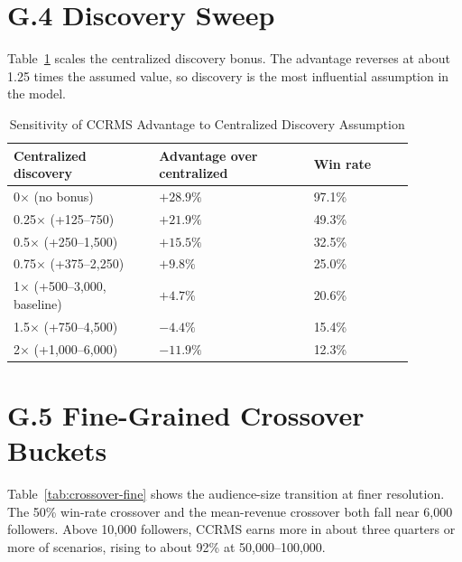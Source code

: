 \section*{G.4 Discovery Sweep}

Table~\ref{tab:discovery-sweep} scales the centralized discovery bonus. The advantage reverses at about 1.25 times the assumed value, so discovery is the most influential assumption in the model.

\begin{table}[h]
\centering
\caption{Sensitivity of CCRMS Advantage to Centralized Discovery Assumption}\label{tab:discovery-sweep}
\begin{tabular}{@{}p{0.32\linewidth} p{0.34\linewidth} p{0.22\linewidth}@{}}
\toprule
\textbf{Centralized discovery} & \textbf{Advantage over centralized} & \textbf{Win rate} \\
\midrule
0$\times$ (no bonus)            & $+28.9\%$ & 97.1\% \\
0.25$\times$ (+125--750)        & $+21.9\%$ & 49.3\% \\
0.5$\times$ (+250--1,500)       & $+15.5\%$ & 32.5\% \\
0.75$\times$ (+375--2,250)      & $+9.8\%$  & 25.0\% \\
1$\times$ (+500--3,000, baseline) & $+4.7\%$ & 20.6\% \\
1.5$\times$ (+750--4,500)       & $-4.4\%$  & 15.4\% \\
2$\times$ (+1,000--6,000)       & $-11.9\%$ & 12.3\% \\
\bottomrule
\end{tabular}
\end{table}

\section*{G.5 Fine-Grained Crossover Buckets}

Table~\ref{tab:crossover-fine} shows the audience-size transition at finer resolution. The 50\% win-rate crossover and the mean-revenue crossover both fall near 6,000 followers. Above 10,000 followers, CCRMS earns more in about three quarters or more of scenarios, rising to about 92\% at 50,000--100,000.

